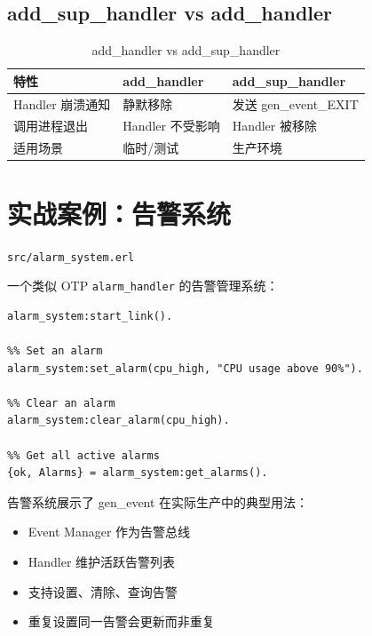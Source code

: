 \documentclass[a4paper,11pt]{article}
\begin{document}
\subsection{add\_sup\_handler vs add\_handler}

\begin{table}[H]
\centering
\begin{tabular}{@{}lll@{}}
\toprule
\textbf{特性} & \textbf{add\_handler} & \textbf{add\_sup\_handler} \\
\midrule
Handler 崩溃通知 & 静默移除 & 发送 gen\_event\_EXIT \\
调用进程退出     & Handler 不受影响 & Handler 被移除 \\
适用场景         & 临时/测试 & 生产环境 \\
\bottomrule
\end{tabular}
\caption{add\_handler vs add\_sup\_handler}
\end{table}


\section{实战案例：告警系统}

\begin{notebox}[源码文件]
\texttt{src/alarm\_system.erl}
\end{notebox}

一个类似 OTP \texttt{alarm\_handler} 的告警管理系统：

\begin{lstlisting}[style=erlangstyle]
%% Start the alarm manager
alarm_system:start_link().

%% Set an alarm
alarm_system:set_alarm(cpu_high, "CPU usage above 90%").

%% Clear an alarm
alarm_system:clear_alarm(cpu_high).

%% Get all active alarms
{ok, Alarms} = alarm_system:get_alarms().
\end{lstlisting}

告警系统展示了 gen\_event 在实际生产中的典型用法：
\begin{itemize}[leftmargin=2em]
    \item Event Manager 作为告警总线
    \item Handler 维护活跃告警列表
    \item 支持设置、清除、查询告警
    \item 重复设置同一告警会更新而非重复
\end{itemize}
\end{document}
